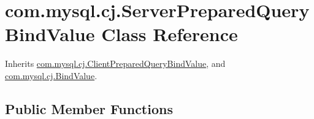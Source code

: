 \hypertarget{classcom_1_1mysql_1_1cj_1_1_server_prepared_query_bind_value}{}\section{com.\+mysql.\+cj.\+Server\+Prepared\+Query\+Bind\+Value Class Reference}
\label{classcom_1_1mysql_1_1cj_1_1_server_prepared_query_bind_value}


Inherits \mbox{\hyperlink{classcom_1_1mysql_1_1cj_1_1_client_prepared_query_bind_value}{com.\+mysql.\+cj.\+Client\+Prepared\+Query\+Bind\+Value}}, and \mbox{\hyperlink{interfacecom_1_1mysql_1_1cj_1_1_bind_value}{com.\+mysql.\+cj.\+Bind\+Value}}.

\subsection*{Public Member Functions}
